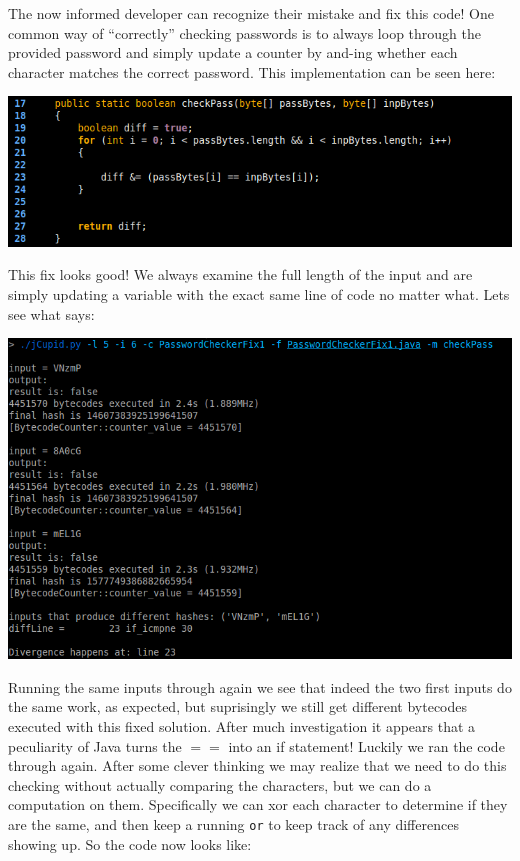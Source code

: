 The now informed developer can recognize their mistake and fix this code! One common way of ``correctly''
checking passwords is to always loop through the provided password and simply update a counter by and-ing
whether each character matches the correct password. This implementation can be seen here:

\begin{center}
  \includegraphics[width=\linewidth]{PasswordCheckerFix1}
\end{center}

This fix looks good! We always examine the full length of the input and are simply updating a variable
with the exact same line of code no matter what. Lets see what \jcupid says:

\begin{center}
  \includegraphics[width=\linewidth]{jCupidRun2}
\end{center}

Running the same inputs through again we see that indeed the two first inputs do the same work, as expected,
but suprisingly we still get different bytecodes executed with this fixed solution. After much investigation
it appears that a peculiarity of Java turns the $==$ into an if statement! Luckily we ran the code through
\jcupid again. After some clever thinking we may realize that we need to do this checking without actually
comparing the characters, but we can do a computation on them. Specifically we can xor each character to
determine if they are the same, and then keep a running \texttt{or} to keep track of any differences showing
up. So the code now looks like:

